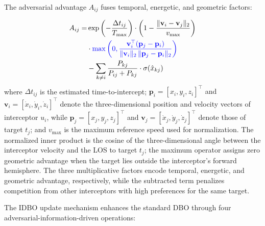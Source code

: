 \documentclass[lettersize,journal]{IEEEtran}
\newcommand{\hladd}[1]{{\color{blue}#1}}
\begin{document}
The adversarial advantage $A_{ij}$ fuses temporal, energetic, and geometric factors:

\begin{equation}
\label{eq:adversarial_advantage}
\begin{split}
A_{ij} =& \exp\left(-\frac{\Delta t_{ij}}{T_{\max}}\right) \cdot \left(1 - \frac{\|\mathbf{v}_i - \mathbf{v}_j\|_2}{v_{\max}}\right) \\
&\cdot \hladd{\max\left(0,
\frac{\mathbf{v}_i^{\top}(\mathbf{p}_j-\mathbf{p}_i)}
{\|\mathbf{v}_i\|_2\,\|\mathbf{p}_j-\mathbf{p}_i\|_2}\right)} \\
&- \sum_{k\neq i} \frac{P_{kj}}{P_{ij} + P_{kj}} \cdot \sigma(\hat{x}_{kj})
\end{split}
\end{equation}
where $\Delta t_{ij}$ is the estimated time-to-intercept; \hladd{$\mathbf{p}_i=[x_i,y_i,z_i]^\top$ and $\mathbf{v}_i=[\dot{x}_i,\dot{y}_i,\dot{z}_i]^\top$ denote the three-dimensional position and velocity vectors of interceptor $u_i$, while $\mathbf{p}_j=[x_j,y_j,z_j]^\top$ and $\mathbf{v}_j=[\dot{x}_j,\dot{y}_j,\dot{z}_j]^\top$ denote those of target $t_j$}; and $v_{\max}$ is the maximum reference speed used for normalization. 
\hladd{The normalized inner product is the cosine of the three-dimensional angle between the interceptor velocity and the LOS to target $t_j$; the maximum operator assigns zero geometric advantage when the target lies outside the interceptor's forward hemisphere.} The three multiplicative factors encode temporal, energetic, and geometric advantage, respectively, while the subtracted term penalizes competition from other interceptors with high preferences for the same target.



The IDBO update mechanism enhances the standard DBO through four adversarial-information-driven operations:
\end{document}
